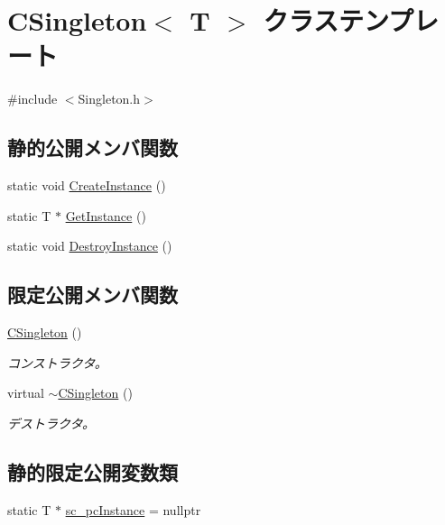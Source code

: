 \hypertarget{class_c_singleton}{}\section{C\+Singleton$<$ T $>$ クラステンプレート}
\label{class_c_singleton}


{\ttfamily \#include $<$Singleton.\+h$>$}

\subsection*{静的公開メンバ関数}
\begin{DoxyCompactItemize}
\item 
static void \hyperlink{class_c_singleton_aae03d09669f6d715c19305e374caf447}{Create\+Instance} ()
\item 
static T $\ast$ \hyperlink{class_c_singleton_adca13e4aead62014a099f8377d2d0daf}{Get\+Instance} ()
\item 
static void \hyperlink{class_c_singleton_a40ab50a27926e8ae1efb62c793d3a425}{Destroy\+Instance} ()
\end{DoxyCompactItemize}
\subsection*{限定公開メンバ関数}
\begin{DoxyCompactItemize}
\item 
\hyperlink{class_c_singleton_a9363c7dab54cf622af286b1732a323a2}{C\+Singleton} ()
\begin{DoxyCompactList}\small\item\em コンストラクタ。 \end{DoxyCompactList}\item 
virtual \hyperlink{class_c_singleton_ab8ec20bd0d6d35ba4ab8987c2cd1bd09}{$\sim$\+C\+Singleton} ()
\begin{DoxyCompactList}\small\item\em デストラクタ。 \end{DoxyCompactList}\end{DoxyCompactItemize}
\subsection*{静的限定公開変数類}
\begin{DoxyCompactItemize}
\item 
static T $\ast$ \hyperlink{class_c_singleton_a0a71a6912e89df78d7f0fc5a79ff6d98}{sc\+\_\+pc\+Instance} = nullptr
\end{DoxyCompactItemize}
